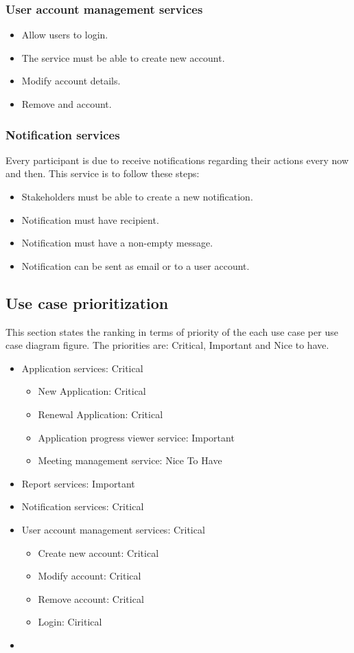 \documentclass[12pt]{article}
\begin{document}
\subsubsection{User account management services} %
\begin{itemize}
	\item Allow users to login.
	\item The service must be able to create new account.
	\item Modify account details.
	\item Remove and account.
\end{itemize}
\subsubsection{Notification services}
Every participant is due to receive notifications regarding their actions every now and then. This service is to follow these steps:
\begin{itemize}
	\item Stakeholders must be able to create a new notification.
	\item Notification must have recipient.
	\item Notification must have a non-empty message.
	\item Notification can  be sent as email or to a user account.
\end{itemize}
\vspace{0.2in}
\subsection{Use case prioritization} %
\vspace{0.2in}
This section states the ranking in terms of priority of the each use case per use case diagram figure. The priorities are: Critical, Important and Nice to have.\\ 
\begin{itemize}
	\item Application services: Critical
	\begin{itemize}
		\item New Application: Critical
		\item Renewal Application: Critical
		\item Application progress viewer service: Important
		\item Meeting management service: Nice To Have
	\end{itemize}
	\item Report services: Important
	\item Notification services: Critical
	\item User account management services: Critical
	\begin{itemize}
		\item Create new account: Critical
		\item Modify account: Critical
		\item Remove account: Critical
		\item Login: Ciritical
	\end{itemize}
	\item 
\end{itemize}
\end{document}
